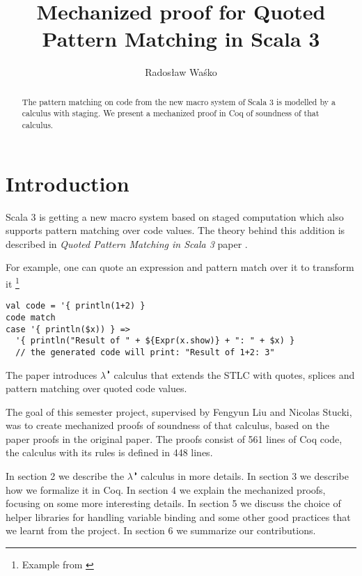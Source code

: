 \documentclass[runningheads]{article}
\begin{document}
\title{Mechanized proof for Quoted Pattern Matching in Scala 3}
%
\author{Radosław Waśko}

%
%
%
\maketitle              %
\begin{abstract}
The pattern matching on code from the new macro system of Scala 3 is modelled by a calculus with staging. We present a mechanized proof in Coq of soundness of that calculus.
%
\end{abstract}
%
%
\section{Introduction}

Scala 3 is getting a new macro system based on staged computation \cite{dottydocMacro} which also supports pattern matching over code values. The theory behind this addition is described in \textit{Quoted Pattern Matching in Scala 3} paper \cite{QPM}. 

For example, one can quote an expression and pattern match over it to transform it \footnote{Example from \cite{QPM}}
\begin{verbatim}
val code = '{ println(1+2) }
code match
case '{ println($x)) } =>
  '{ println("Result of " + ${Expr(x.show)} + ": " + $x) }
  // the generated code will print: "Result of 1+2: 3"
\end{verbatim}

The paper introduces $\lambda^{\RIGHTcircle}$ calculus that extends the STLC with quotes, splices and pattern matching over quoted code values. 

The goal of this semester project, supervised by Fengyun Liu and Nicolas Stucki, was to create mechanized proofs of soundness of that calculus, based on the paper proofs in the original paper. The proofs consist of 561 lines of Coq code,
the calculus with its rules is defined in 448 lines.

In section 2 we describe the $\lambda^{\RIGHTcircle}$ calculus in more details. In section 3 we describe how we formalize it in Coq. In section 4 we explain the mechanized proofs, focusing on some more interesting details. In section 5 we discuss the choice of helper libraries for handling variable binding and some other good practices that we learnt from the project. In section 6 we summarize our contributions.
\end{document}
